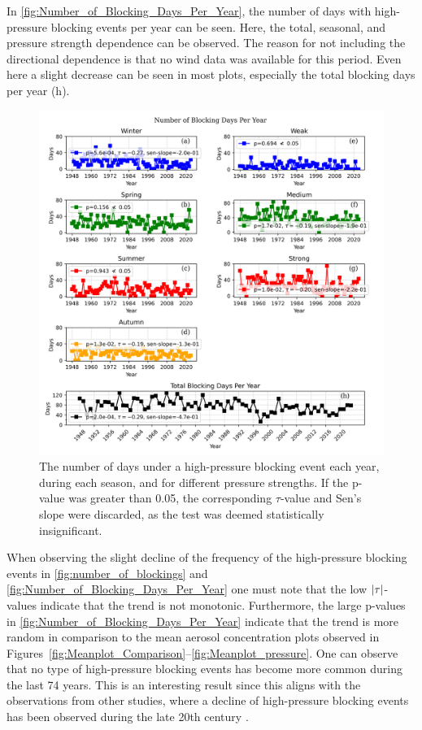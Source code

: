 In \autoref{fig:Number_of_Blocking_Days_Per_Year}, the number of days with high-pressure blocking events per year can be seen. Here, the total, seasonal, and pressure strength dependence can be observed. The reason for not including the directional dependence is that no wind data was available for this period. Even here a slight decrease can be seen in most plots, especially the total blocking days per year (h). 


\begin{figure}[H]
    \centering
    \includegraphics[width=\textwidth]{Figures/blocking_days_per_year_all.png}
    \caption{The number of days under a high-pressure blocking event each year, during each season, and for different pressure strengths. If the p-value was greater than 0.05, the corresponding $\tau$-value and Sen's slope were discarded, as the test was deemed statistically insignificant.} 
    \label{fig:Number_of_Blocking_Days_Per_Year}
\end{figure}

When observing the slight decline of the frequency of the high-pressure blocking events in \autoref{fig:number_of_blockings} and \autoref{fig:Number_of_Blocking_Days_Per_Year} one must note that the low $\left| \tau \right|$-values indicate that the trend is not monotonic. Furthermore, the large p-values in \autoref{fig:Number_of_Blocking_Days_Per_Year} indicate that the trend is more random in comparison to the mean aerosol concentration plots observed in Figures~\ref{fig:Meanplot_Comparison}--\ref{fig:Meanplot_pressure}. One can observe that no type of high-pressure blocking events has become more common during the last 74 years. This is an interesting result since this aligns with the observations from other studies, where a decline of high-pressure blocking events has been observed during the late 20th century \cite{lupoAtmosphericBlockingEvents2020}. 
